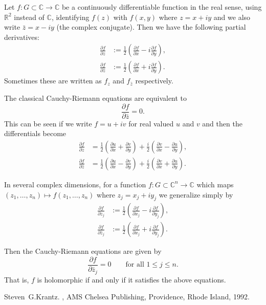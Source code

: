 \documentclass[12pt]{article}
\begin{document}
Let $f \colon G \subset {\mathbb{C}} \to {\mathbb{C}}$ be a continuously differentiable function in the real sense, using ${\mathbb{R}}^2$ instead of
${\mathbb{C}}$, identifying $f(z)$ with $f(x,y)$ where $z = x + iy$ and we also write $\bar{z} = x - iy$ (the complex conjugate).  Then we have the following partial derivatives:
\begin{align*}
\frac{\partial f}{\partial z} & :=
\frac{1}{2} \left(
\frac{\partial f}{\partial x} - i \frac{\partial f}{\partial y}
\right) ,
\\
\frac{\partial f}{\partial \bar{z}} & :=
\frac{1}{2} \left(
\frac{\partial f}{\partial x} + i \frac{\partial f}{\partial y}
\right) .
\end{align*}
Sometimes these are written as $f_z$ and $f_{\bar{z}}$ respectively.

The classical Cauchy-Riemann equations are equivalent to
\begin{equation*}
\frac{\partial f}{\partial \bar{z}} = 0 .
\end{equation*}
This can be seen if we write $f = u+iv$ for real valued $u$ and $v$ and
then the differentials become
\begin{align*}
\frac{\partial f}{\partial z} & =
\frac{1}{2} \left(
\frac{\partial u}{\partial x} + \frac{\partial v}{\partial y}
\right)
+
\frac{i}{2} \left(
\frac{\partial v}{\partial x} - \frac{\partial u}{\partial y}
\right) ,
\\
\frac{\partial f}{\partial \bar{z}} & =
\frac{1}{2} \left(
\frac{\partial u}{\partial x} - \frac{\partial v}{\partial y}
\right)
+
\frac{i}{2} \left(
\frac{\partial v}{\partial x} + \frac{\partial u}{\partial y}
\right) .
\end{align*}


In several complex dimensions, for a function
$f \colon G \subset {\mathbb{C}}^n \to {\mathbb{C}}$ which maps
$(z_1,\ldots,z_n) \mapsto f(z_1,\ldots,z_n)$ where $z_j = x_j + i y_j$ we generalize simply by
\begin{align*}
\frac{\partial f}{\partial z_j} & :=
\frac{1}{2} \left(
\frac{\partial f}{\partial x_j} - i \frac{\partial f}{\partial y_j}
\right) ,
\\
\frac{\partial f}{\partial \bar{z}_j} & :=
\frac{1}{2} \left(
\frac{\partial f}{\partial x_j} + i \frac{\partial f}{\partial y_j}
\right) .
\end{align*}

Then the Cauchy-Riemann equations are given by
\begin{equation*}
\frac{\partial f}{\partial \bar{z}_j} = 0 \qquad \text{for all $1 \leq j \leq n$} .
\end{equation*}
That is, $f$ is holomorphic if and only if it satisfies the above equations.

\begin{thebibliography}{9}
Steven~G.\@ Krantz.
{\em {}},
AMS Chelsea Publishing, Providence, Rhode Island, 1992.
\end{thebibliography}
\end{document}
